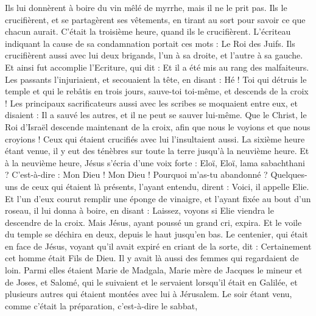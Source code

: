 \begin{multicols}{2}
Ils lui donnèrent à boire du vin mêlé de myrrhe, mais il ne le prit pas.
Ils le crucifièrent, et se partagèrent ses vêtements, en tirant au sort pour savoir ce que chacun aurait.
C’était la troisième heure, quand ils le crucifièrent.
L’écriteau indiquant la cause de sa condamnation portait ces mots : Le Roi des Juifs.
Ils crucifièrent aussi avec lui deux brigands, l'un à sa droite, et l'autre à sa gauche.
Et ainsi fut accomplie l'Ecriture, qui dit : Et il a été mis au rang des malfaiteurs{}.
Les passants l’injuriaient, et secouaient la tête, en disant : Hé ! Toi qui détruis le temple et qui le rebâtis en trois jours,
sauve-toi toi-même, et descends de la croix !
Les principaux sacrificateurs aussi avec les scribes se moquaient entre eux, et disaient : Il a sauvé les autres, et il ne peut se sauver lui-même.
Que le Christ, le Roi d’Israël descende maintenant de la croix, afin que nous le voyions et que nous croyions ! Ceux qui étaient crucifiés avec lui l’insultaient aussi.
La sixième heure étant venue, il y eut des ténèbres sur toute la terre jusqu'à la neuvième heure.
Et à la neuvième heure, Jésus s’écria d’une voix forte : Eloï, Eloï, lama sabachthani ? C’est-à-dire : Mon Dieu ! Mon Dieu ! Pourquoi m'as-tu abandonné ?
Quelques-uns de ceux qui étaient là présents, l’ayant entendu, dirent : Voici, il appelle Elie.
Et l’un d’eux courut remplir une éponge de vinaigre{}, et l'ayant fixée au bout d'un roseau, il lui donna à boire, en disant : Laissez, voyons si Elie viendra le descendre de la croix.
Mais Jésus, ayant poussé un grand cri, expira.
Et le voile du temple se déchira en deux, depuis le haut jusqu'en bas{}.
Le centenier, qui était en face de Jésus, voyant qu'il avait expiré en criant de la sorte, dit : Certainement cet homme était Fils de Dieu.
Il y avait là aussi des femmes qui regardaient de loin. Parmi elles étaient Marie de Madgala, Marie mère de Jacques le mineur et de Joses, et Salomé,
qui le suivaient et le servaient lorsqu'il était en Galilée, et plusieurs autres qui étaient montées avec lui à Jérusalem.
Le soir étant venu, comme c'était la préparation, c’est-à-dire le sabbat,

\end{multicols}
